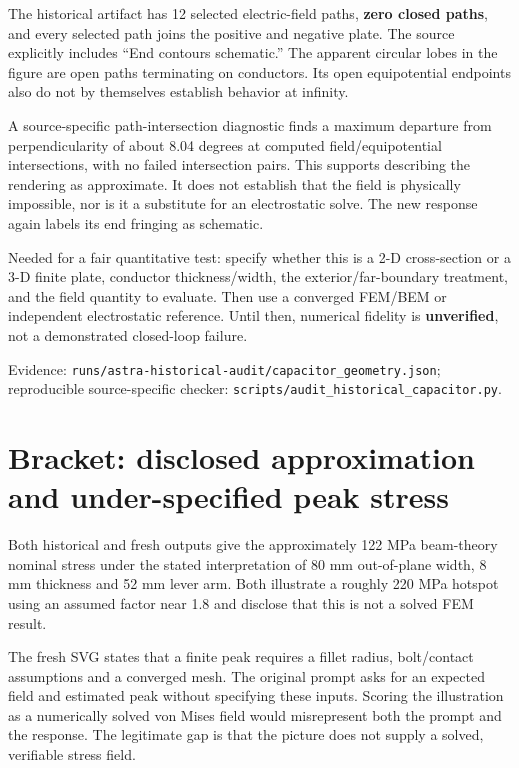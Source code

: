 \documentclass[
  11pt,
  a4paper,
]{article}
\begin{document}
The historical artifact has 12 selected electric-field paths,
\textbf{zero closed paths}, and every selected path joins the positive
and negative plate. The source explicitly includes ``End contours
schematic.'' The apparent circular lobes in the figure are open paths
terminating on conductors. Its open equipotential endpoints also do not
by themselves establish behavior at infinity.

A source-specific path-intersection diagnostic finds a maximum departure
from perpendicularity of about 8.04 degrees at computed
field/equipotential intersections, with no failed intersection pairs.
This supports describing the rendering as approximate. It does not
establish that the field is physically impossible, nor is it a
substitute for an electrostatic solve. The new response again labels its
end fringing as schematic.

Needed for a fair quantitative test: specify whether this is a 2-D
cross-section or a 3-D finite plate, conductor thickness/width, the
exterior/far-boundary treatment, and the field quantity to evaluate.
Then use a converged FEM/BEM or independent electrostatic reference.
Until then, numerical fidelity is \textbf{unverified}, not a
demonstrated closed-loop failure.

Evidence:
\nolinkurl{runs/astra-historical-audit/capacitor_geometry.json};
reproducible source-specific checker:
\nolinkurl{scripts/audit_historical_capacitor.py}.

\section{Bracket: disclosed approximation and under-specified peak
stress}\label{bracket-disclosed-approximation-and-under-specified-peak-stress}

Both historical and fresh outputs give the approximately 122 MPa
beam-theory nominal stress under the stated interpretation of 80 mm
out-of-plane width, 8 mm thickness and 52 mm lever arm. Both illustrate
a roughly 220 MPa hotspot using an assumed factor near 1.8 and disclose
that this is not a solved FEM result.

The fresh SVG states that a finite peak requires a fillet radius,
bolt/contact assumptions and a converged mesh. The original prompt asks
for an expected field and estimated peak without specifying these
inputs. Scoring the illustration as a numerically solved von Mises field
would misrepresent both the prompt and the response. The legitimate gap
is that the picture does not supply a solved, verifiable stress field.
\end{document}
